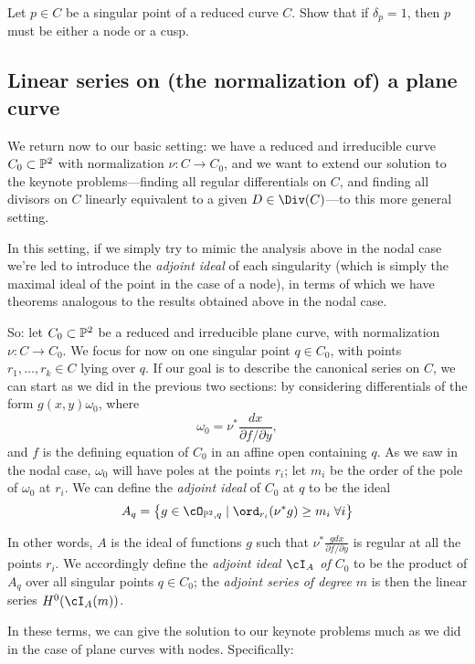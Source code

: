 \begin{exercise}
Let $p \in C$ be a singular point of a reduced curve $C$. Show that if $\delta_p = 1$, then $p$ must be either a node or a cusp.
\end{exercise}



\subsection{Linear series on (the normalization of) a plane curve} 

We return now to our basic setting: we have a reduced and irreducible curve $C_0 \subset \PP^2$ with normalization $\nu : C \to C_0$, and we want to extend our solution to the keynote problems---finding all regular differentials on $C$, and finding all divisors on $C$ linearly equivalent to a given $D \in \Div(C)$---to this more general setting.

In this setting, if we simply try to mimic the analysis above in the nodal case we're led to introduce the \emph{adjoint ideal} of each singularity (which is simply the maximal ideal of the point in the case of a node), in terms of which we have theorems analogous to the results obtained above in the nodal case.

So: let $C_0 \subset \PP^2$ be a reduced and irreducible plane curve, with normalization $\nu : C \to C_0$. We focus for now on one singular point $q \in C_0$, with points $r_1,\dots,r_k \in C$ lying over $q$. If our goal is to describe the canonical series on $C$, we can start as we did in the previous two sections: by considering differentials of  the form $g(x,y)\omega_0$, where
$$
\omega_0 = \nu^* \frac{dx}{\partial f/\partial y},
$$
and $f$ is the defining equation of $C_0$ in an affine open containing $q$. As we saw in the nodal case, $\omega_0$ will have poles at the points $r_i$; let $m_i$ be the order of the pole of $\omega_0$ at $r_i$. We can define the \emph{adjoint ideal} of $C_0$ at $q$ to be the ideal
$$
A_q = \left\{ g \in \cO_{\PP^2, q} \mid \ord_{r_i}(\nu^*g) \geq m_i \; \forall i \right\}
$$

In other words, $A$ is the ideal of functions $g$ such that $\nu^* \frac{gdx}{\partial f/\partial y}$ is regular at all the points $r_i$. We accordingly define the \emph{adjoint ideal $\cI_A$ of $C_0$} to be the product of $A_q$ over all singular points  $q \in C_0$; the \emph{adjoint series of degree $m$} is then the linear series $H^0(\cI_A(m))$. 

In these terms, we can give the solution to our keynote problems much as we did in the case of plane curves with nodes. Specifically:

